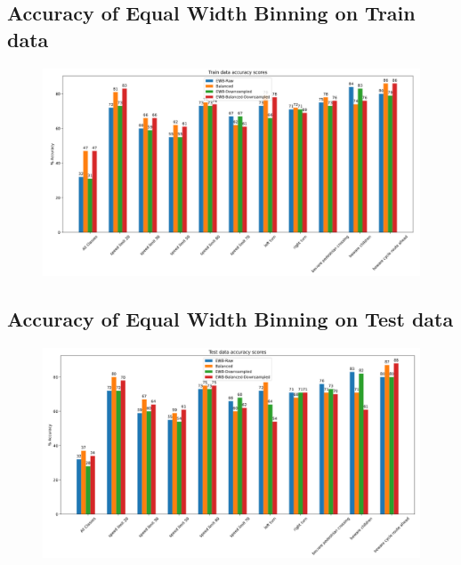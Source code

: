 \documentclass[11pt]{article}
\begin{document}
\begin{appendices}
\subsection{Accuracy of Equal Width Binning on Train data}\label{BarChartEWBTrain}
\begin{figure}[h!]
  \centering
  \includegraphics[width=1\textwidth]{Images/BarChartEWBTrain.PNG}
\end{figure}

\subsection{Accuracy of Equal Width Binning on Test data}\label{BarChartEWBTest}
  \begin{figure}[h!] 
    \centering
    \includegraphics[scale=0.6]{Images/BarChartEWBTest.PNG}
\end{figure}

\newpage

\end{appendices}
\end{document}
